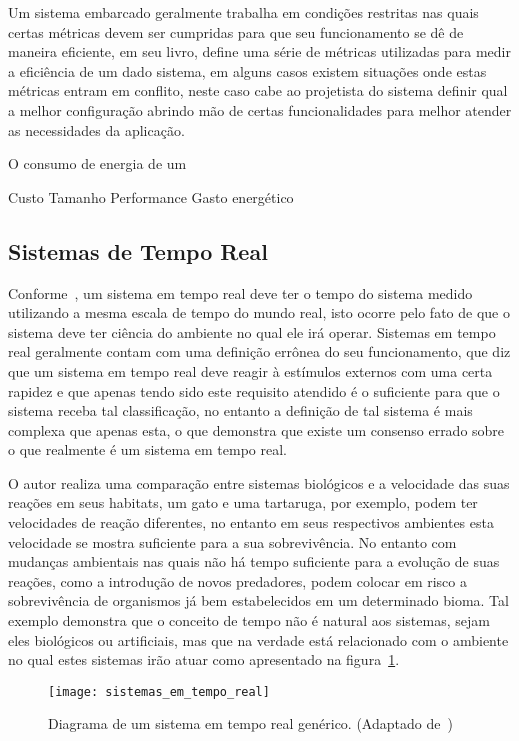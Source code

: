 Um sistema embarcado geralmente trabalha em condições restritas nas quais certas métricas devem ser cumpridas para que seu funcionamento se dê de maneira eficiente, em seu livro, \cite{marwedel:2011} define uma série de métricas utilizadas para medir a eficiência de um dado sistema, em alguns casos existem situações onde estas métricas entram em conflito, neste caso cabe ao projetista do sistema definir qual a melhor configuração abrindo mão de certas funcionalidades para melhor atender as necessidades da aplicação. 

O consumo de energia de um 

Custo
Tamanho
Performance
Gasto energético

\subsection{Sistemas de Tempo Real} %

Conforme~\cite{BUTTAZZO:2011}, um sistema em tempo real deve ter o tempo do sistema medido utilizando a mesma escala de tempo do mundo real, isto ocorre pelo fato de que o sistema deve ter ciência do ambiente no qual ele irá operar. Sistemas em tempo real geralmente contam com uma definição errônea do seu funcionamento, que diz que um sistema em tempo real deve reagir à estímulos externos com uma certa rapidez e que apenas tendo sido este requisito atendido é o suficiente para que o sistema receba tal classificação, no entanto a definição de tal sistema é mais complexa que apenas esta, o que demonstra que existe um consenso errado sobre o que realmente é um sistema em tempo real.

O autor realiza uma comparação entre sistemas biológicos e a velocidade das suas reações em seus habitats, um gato e uma tartaruga, por exemplo, podem ter velocidades de reação diferentes, no entanto em seus respectivos ambientes esta velocidade se mostra suficiente para a sua sobrevivência. No entanto com mudanças ambientais nas quais não há tempo suficiente para a evolução de suas reações, como a introdução de novos predadores, podem colocar em risco a sobrevivência de organismos já bem estabelecidos em um determinado bioma. Tal exemplo demonstra que o conceito de tempo não é natural aos sistemas, sejam eles biológicos ou artificiais, mas que na verdade está relacionado com o ambiente no qual estes sistemas irão atuar como apresentado na figura~\ref{fig:rt}.

\begin{figure}[h]
	\texttt{[image: sistemas\_em\_tempo\_real]}
    \centering
    \caption{Diagrama de um sistema em tempo real genérico. (Adaptado de~\cite{BUTTAZZO:2011})}
    \label{fig:rt}
\end{figure}

